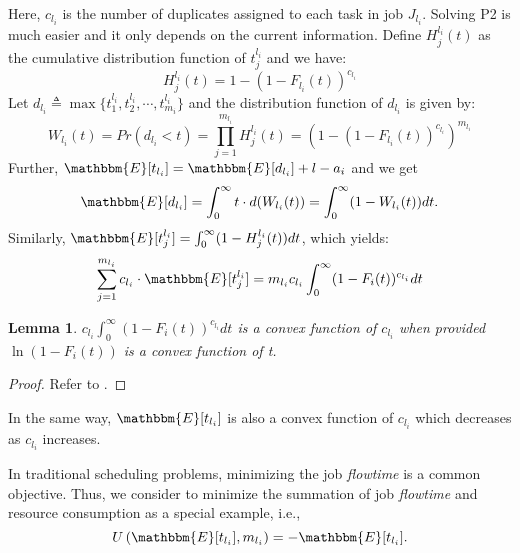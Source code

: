 \documentclass[10pt,conference]{IEEEtran}
\newtheorem{lemma}{Lemma}
\begin{document}
Here, $c_{l_i}$ is the number of duplicates assigned to each task in job $J_{l_i}$. Solving P2 is much easier and it only depends on the current information. Define $H^{l_i}_j(t)$ as the cumulative distribution function of $t^{l_i}_{j}$ and we have:
\begin{equation}
H^{l_i}_j(t) = 1-(1-F_{l_i}(t))^{c_{l_i}}
\end{equation}
Let $d_{l_i} \triangleq  \max\{t^{l_i}_{1}, t^{l_i}_{2}, \cdots, t^{l_i}_{m_i}\}$ and the distribution function of $d_{l_i}$ is given by:
\begin{equation}
W_{l_i}(t) = Pr(d_{l_i} < t) = \prod_{j = 1}^{m_{l_i}} H^{l_i}_j(t) = (1-(1-F_{l_i}(t))^{c_{l_i}})^{m_{l_i}}
\end{equation}
Further, $ \mathbbm{E}[t_{l_i}] =  \mathbbm{E}[d_{l_i}] + l - a_i$ and we get
\begin{equation}
\mathbbm{E}[d_{l_i}] = \int_{0}^{\infty}t\cdot d(W_{l_i}(t)) = \int_{0}^{\infty}(1-W_{l_i}(t))dt.
\end{equation}
Similarly,
$\mathbbm{E}[t^{l_i}_j] = \int_{0}^{\infty}(1-H^{l_i}_j(t))dt$, which yields:
\begin{equation}
 \sum_{j=1}^{m_{l_i}}c_{l_i}\cdot \mathbbm{E}[t^{l_i}_j] = m_{l_i}c_{l_i}\int_{0}^{\infty}(1-F_i(t))^{c_{l_i}}dt
\end{equation}

\begin{lemma}
$c_{l_i} \int_{0}^{\infty}(1-F_i(t))^{c_{l_i}}dt$ is a convex function of $c_{l_i}$ when provided $\ln{(1-F_i(t))}$ is a convex function of t.
\end{lemma}

\begin{proof}
Refer to \cite{speculative-multi-job}.
\end{proof}
\vspace{.5em}
In the same way, $\mathbbm{E}[t_{l_i}] $ is also a convex function of $c_{l_i}$ which decreases as $c_{l_i}$ increases.

In traditional scheduling problems, minimizing the job \textit{flowtime} is a common objective. Thus, we consider to minimize the summation of job \textit{flowtime} and resource consumption as a special example, i.e., $$U\left( \mathbbm{E}[t_{l_i}],m_{l_i}\right) = - \mathbbm{E}[t_{l_i}].$$
\end{document}
